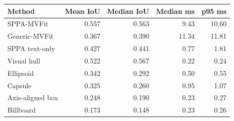 \begin{tabular}{@{}lrrrr@{}}
\toprule
Method & Mean IoU & Median IoU & Median ms & p95 ms \\
\midrule
SPPA-MVFit & 0.557 & 0.563 & 9.43 & 10.60 \\
Generic-MVFit & 0.367 & 0.390 & 11.34 & 11.81 \\
SPPA text-only & 0.427 & 0.441 & 0.77 & 1.81 \\
Visual hull & 0.522 & 0.567 & 0.22 & 0.24 \\
Ellipsoid & 0.342 & 0.292 & 0.50 & 0.55 \\
Capsule & 0.325 & 0.260 & 0.95 & 1.07 \\
Axis-aligned box & 0.248 & 0.190 & 0.23 & 0.27 \\
Billboard & 0.173 & 0.148 & 0.23 & 0.26 \\
\bottomrule
\end{tabular}
